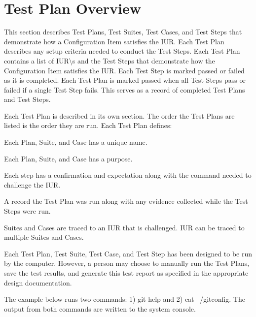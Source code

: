 \newpage
\section{Test Plan Overview}
This section describes Test Plans, Test Suites, Test Cases, and Test Steps that
demonstrate how a Configuration Item satisfies the IUR.  Each Test Plan
describes any setup criteria needed to conduct the Test Steps. Each Test Plan
contains a list of IUR\textbackslash{s} and the Test Steps that demonstrate how
the Configuration Item satisfies the IUR. Each Test Step is marked passed or
failed as it is completed.  Each Test Plan is marked passed when all Test Steps
pass or failed if a single Test Step fails.  This serves as a record of
completed Test Plans and Test Steps.

Each Test Plan is described in its own section.  The order the Test Plans
are listed is the order they are run.  Each Test Plan defines:

\begin{description}[labelindent=25pt, style=multiline, leftmargin=4.0cm]

\item[name]
  Each Plan, Suite, and Case has a unique name.

\item[purpose]
  Each Plan, Suite, and Case has a purpose.

\item[Test Steps]
  Each step has a confirmation and expectation along with the command needed to
  challenge the IUR.

\item[Objective Evidence]
  A record the Test Plan was run along with any evidence collected while the
  Test Steps were run.

\item[Traceability]
  Suites and Cases are traced to an IUR that is challenged. IUR can be traced to
  multiple Suites and Cases.

\end{description}

Each Test Plan, Test Suite, Test Case,  and Test Step has been designed to be
run by the computer. However, a person may choose to manually run the Test
Plans, save the test results, and generate this test report as specified in the
appropriate design documentation.

The example below runs two commands: 1) git help and 2) cat ~/gitconfig.  The
output from both commands are written to the system console.

